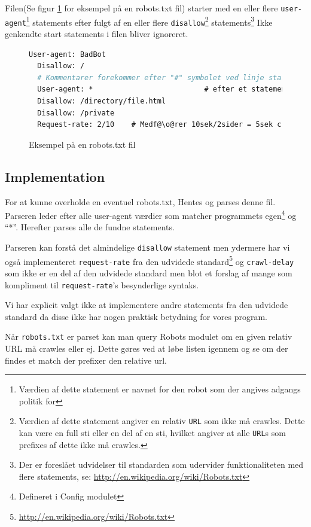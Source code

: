 \documentclass[a4paper,oneside]{memoir}
\begin{document}
Filen(Se figur \ref{eksrobotstxtfile} for eksempel på en robots.txt fil) starter
med en eller flere \texttt{user-agent}\footnote{Værdien af dette
statement er navnet for den robot som der angives adgangs politik for}
statements efter fulgt af en eller flere \texttt{disallow}\footnote{Værdien af
dette statement angiver en relativ \texttt{URL} som ikke må crawles. Dette kan
være en full sti eller en del af en sti, hvilket angiver at alle \texttt{URL}s
som prefixes af dette ikke må crawles.} statements\footnote{Der er foreslået
udvidelser til standarden som udervider funktionaliteten med flere statements,
se: \url{http://en.wikipedia.org/wiki/Robots.txt}} 
Ikke genkendte start statements i filen bliver ignoreret.

\begin{figure}
\begin{lstlisting}[language=csh,
                   escapechar=\@]
  User-agent: BadBot
  Disallow: /
  # Kommentarer forekommer efter "#" symbolet ved linje start eller
  User-agent: *                          # efter et statement
  Disallow: /directory/file.html
  Disallow: /private 
  Request-rate: 2/10    # Medf@\o@rer 10sek/2sider = 5sek crawl delay
\end{lstlisting}

  \caption{Eksempel på en robots.txt fil}
  \label{eksrobotstxtfile}
\end{figure}


\subsection{Implementation}

For at kunne overholde en eventuel robots.txt, Hentes og parses denne fil.
Parseren leder efter alle user-agent værdier som matcher
programmets egen\footnote{Defineret i Config modulet} og ``*''. Herefter
parses alle de fundne statements.

Parseren kan forstå det almindelige \texttt{disallow} statement men
ydermere har vi også implementeret \texttt{request-rate} fra den udvidede
standard\footnote{\url{http://en.wikipedia.org/wiki/Robots.txt}} og
\texttt{crawl-delay} som ikke er en del af den udvidede standard men blot et
forslag af mange som kompliment til \texttt{request-rate}'s besynderlige
syntaks. 

Vi har explicit valgt ikke at implementere andre statements fra den
udvidede standard da disse ikke har nogen praktisk betydning for vores
program.

Når \texttt{robots.txt} er parset kan man query Robots modulet om en given
relativ URL må crawles eller ej. Dette gøres ved at løbe listen igennem
og se om der findes et match der prefixer den relative url.
\end{document}
